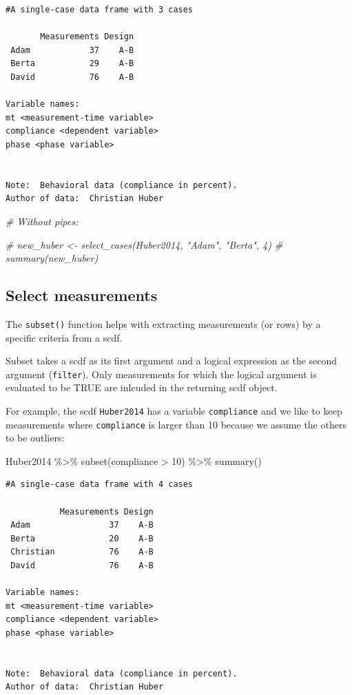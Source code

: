 \documentclass[
]{book}
\newenvironment{Shaded}{\begin{snugshade}}{\end{snugshade}}
\newcommand{\CommentTok}[1]{\textcolor[rgb]{0.56,0.35,0.01}{\textit{#1}}}
\newcommand{\DecValTok}[1]{\textcolor[rgb]{0.00,0.00,0.81}{#1}}
\newcommand{\FunctionTok}[1]{\textcolor[rgb]{0.00,0.00,0.00}{#1}}
\newcommand{\NormalTok}[1]{#1}
\newcommand{\SpecialCharTok}[1]{\textcolor[rgb]{0.00,0.00,0.00}{#1}}
\begin{document}
\begin{verbatim}
#A single-case data frame with 3 cases

       Measurements Design
 Adam            37    A-B
 Berta           29    A-B
 David           76    A-B

Variable names:
mt <measurement-time variable>
compliance <dependent variable>
phase <phase variable>


Note:  Behavioral data (compliance in percent).
Author of data:  Christian Huber 
\end{verbatim}

\begin{Shaded}
\begin{Highlighting}[]
\CommentTok{\# Without pipes:}

\CommentTok{\# new\_huber \textless{}{-} select\_cases(Huber2014, "Adam", "Berta", 4)}
\CommentTok{\# summary(new\_huber)}
\end{Highlighting}
\end{Shaded}

\hypertarget{select-measurements}{%
\subsection{Select measurements}\label{select-measurements}}

The \texttt{subset()} function helps with extracting measurements (or rows) by a specific criteria from a scdf.

Subset takes a scdf as its first argument and a logical expression as the second argument (\texttt{filter}). Only measurements for which the logical argument is evaluated to be TRUE are inlcuded in the returning scdf object.

For example, the scdf \texttt{Huber2014} has a variable \texttt{compliance} and we like to keep measurements where \texttt{compliance} is larger than 10 because we assume the others to be outliers:

\begin{Shaded}
\begin{Highlighting}[]
\NormalTok{Huber2014 }\SpecialCharTok{\%\textgreater{}\%}
  \FunctionTok{subset}\NormalTok{(compliance }\SpecialCharTok{\textgreater{}} \DecValTok{10}\NormalTok{) }\SpecialCharTok{\%\textgreater{}\%}
  \FunctionTok{summary}\NormalTok{()}
\end{Highlighting}
\end{Shaded}

\begin{verbatim}
#A single-case data frame with 4 cases

           Measurements Design
 Adam                37    A-B
 Berta               20    A-B
 Christian           76    A-B
 David               76    A-B

Variable names:
mt <measurement-time variable>
compliance <dependent variable>
phase <phase variable>


Note:  Behavioral data (compliance in percent).
Author of data:  Christian Huber 
\end{verbatim}
\end{document}
